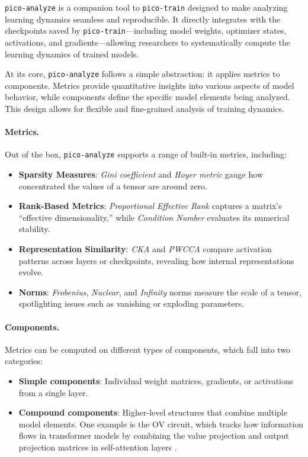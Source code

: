 \texttt{pico-analyze} is a companion tool to \texttt{pico-train} designed to make analyzing learning dynamics seamless and reproducible. It directly integrates with the checkpoints saved by \texttt{pico-train}—including model weights, optimizer states, activations, and gradients—allowing researchers to systematically compute the learning dynamics of trained models.

At its core, \texttt{pico-analyze} follows a simple abstraction: it applies metrics to components. Metrics provide quantitative insights into various aspects of model behavior, while components define the specific model elements being analyzed. This design allows for flexible and fine-grained analysis of training dynamics.

\paragraph{Metrics.} Out of the box, \texttt{pico-analyze} supports a range of built-in metrics, including:
\begin{itemize}
    \item \textbf{Sparsity Measures}: \textit{Gini coefficient} \citep{hurley2009gini} and \textit{Hoyer metric} \citep{hoyer2004sparsity} gauge how concentrated the values of a tensor are around zero.

    \item \textbf{Rank-Based Metrics}: \textit{Proportional Effective Rank} \citep{diehlmartinez2024tending} captures a matrix’s “effective dimensionality,” while \textit{Condition Number} evaluates its numerical stability.

    \item \textbf{Representation Similarity}: \textit{CKA} \citep{kornblith2019cka} and \textit{PWCCA} \citep{morcos2018pwcca} compare activation patterns across layers or checkpoints, revealing how internal representations evolve.
    
    \item \textbf{Norms}: \textit{Frobenius}, \textit{Nuclear}, and \textit{Infinity} norms measure the scale of a tensor, spotlighting issues such as vanishing or exploding parameters.
\end{itemize}

\paragraph{Components.} Metrics can be computed on different types of components, which fall into two categories: 
\begin{itemize} 
\item \textbf{Simple components}: Individual weight matrices, gradients, or activations from a single layer. 
\item \textbf{Compound components}: Higher-level structures that combine multiple model elements. One example is the OV circuit, which tracks how information flows in transformer models by combining the value projection and output projection matrices in self-attention layers \cite{elhage2021mathematical}. 
\end{itemize}

